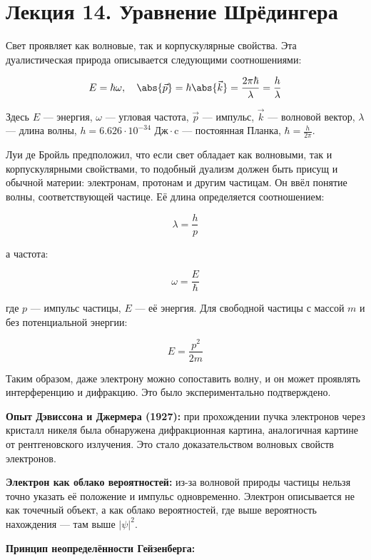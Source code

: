 \documentclass[12pt]{article}
\begin{document}






\section{Лекция 14. Уравнение Шрёдингера}

Свет проявляет как волновые, так и корпускулярные свойства. Эта дуалистическая природа описывается следующими соотношениями:

\[
E = \hbar \omega, \quad \abs{\vec{p}} = \hbar \abs{\vec{k}} = \frac{2\pi \hbar}{\lambda} = \frac{h}{\lambda}
\]

Здесь $E$ — энергия, $\omega$ — угловая частота, $\vec{p}$ — импульс, $\vec{k}$ — волновой вектор, $\lambda$ — длина волны, $h = 6.626 \cdot 10^{-34} \text{ Дж}\cdot\text{c}$ — постоянная Планка, $\hbar = \frac{h}{2\pi}$.

Луи де Бройль предположил, что если свет обладает как волновыми, так и корпускулярными свойствами, то подобный дуализм должен быть присущ и обычной материи: электронам, протонам и другим частицам. Он ввёл понятие волны, соответствующей частице. Её длина определяется соотношением:

\[
\lambda = \frac{h}{p}
\]

а частота:

\[
\omega = \frac{E}{\hbar}
\]

где $p$ — импульс частицы, $E$ — её энергия. Для свободной частицы с массой $m$ и без потенциальной энергии:

\[
E = \frac{p^2}{2m}
\]

Таким образом, даже электрону можно сопоставить волну, и он может проявлять интерференцию и дифракцию. Это было экспериментально подтверждено.

\textbf{Опыт Дэвиссона и Джермера (1927):} при прохождении пучка электронов через кристалл никеля была обнаружена дифракционная картина, аналогичная картине от рентгеновского излучения. Это стало доказательством волновых свойств электронов.

\textbf{Электрон как облако вероятностей:} из-за волновой природы частицы нельзя точно указать её положение и импульс одновременно. Электрон описывается не как точечный объект, а как облако вероятностей, где выше вероятность нахождения — там выше $|\psi|^2$.

\textbf{Принцип неопределённости Гейзенберга:}
\end{document}
